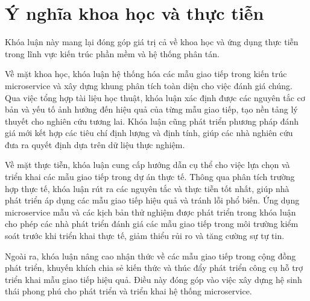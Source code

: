 \section{Ý nghĩa khoa học và thực tiễn}
Khóa luận này mang lại đóng góp giá trị cả về khoa học và ứng dụng thực tiễn trong lĩnh vực kiến trúc phần mềm và hệ thống phân tán.

Về mặt khoa học, khóa luận hệ thống hóa các mẫu giao tiếp trong kiến trúc microservice và xây dựng khung phân tích toàn diện cho việc đánh giá chúng. Qua việc tổng hợp tài liệu học thuật, khóa luận xác định được các nguyên tắc cơ bản và yếu tố ảnh hưởng đến hiệu quả của từng mẫu giao tiếp, tạo nền tảng lý thuyết cho nghiên cứu tương lai. Khóa luận cũng phát triển phương pháp đánh giá mới kết hợp các tiêu chí định lượng và định tính, giúp các nhà nghiên cứu đưa ra quyết định dựa trên dữ liệu thực nghiệm.

Về mặt thực tiễn, khóa luận cung cấp hướng dẫn cụ thể cho việc lựa chọn và triển khai các mẫu giao tiếp trong dự án thực tế. Thông qua phân tích trường hợp thực tế, khóa luận rút ra các nguyên tắc và thực tiễn tốt nhất, giúp nhà phát triển áp dụng các mẫu giao tiếp hiệu quả và tránh lỗi phổ biến. Ứng dụng microservice mẫu và các kịch bản thử nghiệm được phát triển trong khóa luận cho phép các nhà phát triển đánh giá các mẫu giao tiếp trong môi trường kiểm soát trước khi triển khai thực tế, giảm thiểu rủi ro và tăng cường sự tự tin.

Ngoài ra, khóa luận nâng cao nhận thức về các mẫu giao tiếp trong cộng đồng phát triển, khuyến khích chia sẻ kiến thức và thúc đẩy phát triển công cụ hỗ trợ triển khai mẫu giao tiếp hiệu quả. Điều này đóng góp vào việc xây dựng hệ sinh thái phong phú cho phát triển và triển khai hệ thống microservice.